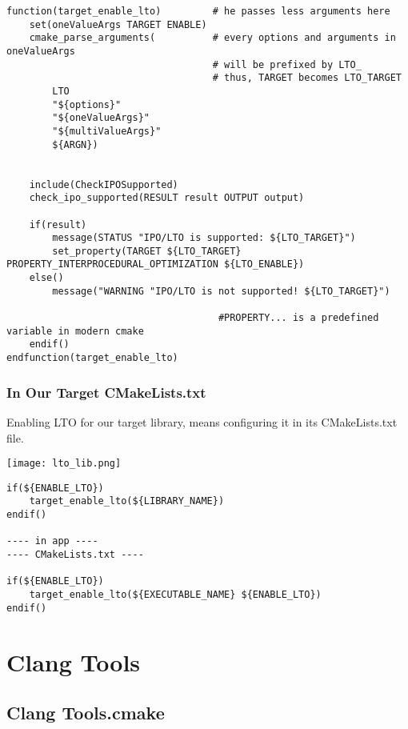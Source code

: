 \documentclass[openany]{report}
\begin{document}
\begin{verbatim}
function(target_enable_lto)         # he passes less arguments here
    set(oneValueArgs TARGET ENABLE)
    cmake_parse_arguments(          # every options and arguments in oneValueArgs
                                    # will be prefixed by LTO_
                                    # thus, TARGET becomes LTO_TARGET
        LTO
        "${options}"
        "${oneValueArgs}"
        "${multiValueArgs}"
        ${ARGN})


    include(CheckIPOSupported)
    check_ipo_supported(RESULT result OUTPUT output)

    if(result) 
        message(STATUS "IPO/LTO is supported: ${LTO_TARGET}")
        set_property(TARGET ${LTO_TARGET} PROPERTY_INTERPROCEDURAL_OPTIMIZATION ${LTO_ENABLE})
    else()
        message("WARNING "IPO/LTO is not supported! ${LTO_TARGET}")

                                     #PROPERTY... is a predefined variable in modern cmake
    endif()
endfunction(target_enable_lto)
\end{verbatim}

\subsection{In Our Target CMakeLists.txt}

Enabling LTO for our target library, means configuring it in its CMakeLists.txt file.

\begin{center}
    \texttt{[image: lto\_lib.png]}
\end{center}


\begin{verbatim}
if(${ENABLE_LTO})
    target_enable_lto(${LIBRARY_NAME})
endif()

---- in app ----
---- CMakeLists.txt ----

if(${ENABLE_LTO})
    target_enable_lto(${EXECUTABLE_NAME} ${ENABLE_LTO})
endif()
\end{verbatim}

\chapter{Clang Tools}

\section{Clang Tools.cmake}
\end{document}
